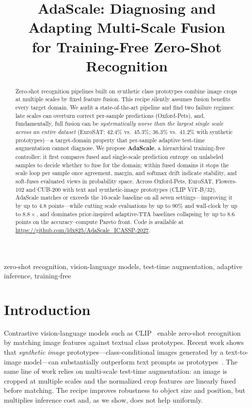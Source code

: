 \documentclass{article}
\title{AdaScale: Diagnosing and Adapting Multi-Scale Fusion\\ for Training-Free Zero-Shot Recognition}
\begin{document}
\sloppy
\maketitle
\vspace{-0.75em}

\begin{abstract}
Zero-shot recognition pipelines built on synthetic class prototypes
combine image crops at multiple scales by fixed
feature fusion. This recipe silently assumes fusion benefits every
target domain. We audit a state-of-the-art pipeline and find two
failure regimes: late scales can overturn correct per-sample
predictions (Oxford-Pets), and, fundamentally, full fusion can be
\emph{systematically worse than the largest single scale across an
entire dataset} (EuroSAT: 42.4\% vs.\ 45.3\%; 36.3\% vs.\ 41.2\%
with synthetic prototypes)---a target-domain property that per-sample
adaptive test-time augmentation cannot diagnose. We propose
\textbf{AdaScale}, a hierarchical training-free controller:
it first compares fused and single-scale prediction entropy on
unlabeled samples to decide whether to fuse for the domain;
within fused domains it stops the scale loop per sample once agreement,
margin, and softmax drift indicate stability, and soft-fuses
evaluated views in probability space. Across Oxford-Pets,
EuroSAT, Flowers-102 and CUB-200 with text and synthetic-image
prototypes (CLIP ViT-B/32), AdaScale matches or exceeds the 10-scale
baseline on all seven settings---improving it by up to
4.8 points---while cutting scale evaluations by up to 90\% and
wall-clock by up to $8.8\times$, and dominates prior-inspired
adaptive-TTA baselines collapsing by up to 8.6 points on the
accuracy--compute Pareto front.
Code is available at \url{https://github.com/ldx825/AdaScale_ICASSP-2027}.
\end{abstract}

\begin{keywords}
zero-shot recognition, vision-language models, test-time augmentation,
adaptive inference, training-free
\end{keywords}

\section{Introduction}
\label{sec:intro}
Contrastive vision-language models such as CLIP~\cite{radford2021clip}
enable zero-shot recognition by matching image features against textual
class prototypes. Recent work shows that \emph{synthetic image}
prototypes---class-conditional images generated by a text-to-image
model---can substantially outperform text prompts as
prototypes~\cite{shi2026lgclip}. The same line of work relies on
multi-scale test-time augmentation: an image is cropped at multiple
scales and the normalized crop features are linearly fused before
matching. The recipe improves robustness to object size and position,
but multiplies inference cost and, as we show, does not help uniformly.
\end{document}
